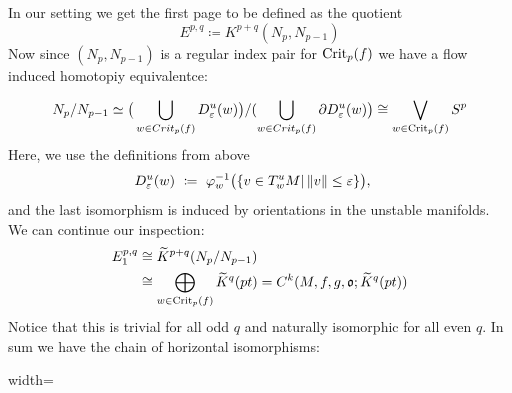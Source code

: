 \begin{corollary}
	In our setting we get the first page to be defined as the quotient
	\begin{equation*}
		E^{p,q}  \coloneq K^{p+q}(N_p,N_{p-1})
	\end{equation*}
	Now since $(N_p,N_{p-1})$ is a regular index pair for $\mathrm{Crit}_p(f)$ we have a flow induced homotopiy equivalentce:
	
	\begin{equation*}
		N_p\slash N_{p-1}
		\simeq          \big(\bigcup_{w\in Crit_p(f)}D^u_\varepsilon(w)\big) \slash (\bigcup_{w\in Crit_p(f)} \partial D^u_\varepsilon(w)\big)
		\cong           \bigvee_{w\in \mathrm{Crit}_p(f)}S^p
	\end{equation*} Here, we use the definitions from above
	\begin{align*}
		D^{u}_\varepsilon (w)&~\coloneq~ \varphi_w^{-1} \big(\{v\in T_w^{u }M | \left\lVert v\right\rVert\leq \varepsilon \} \big),
	\end{align*}and the last isomorphism is induced by orientations in the unstable manifolds. We can continue our inspection:
	\begin{align}\label{def: The Map between E_1 and Morse chain group}
		E^{p,q}_1&\cong \widetilde{K}^{p+q}(N_p\slash N_{p-1})\\
		&\cong \bigoplus_{w\in \mathrm{Crit}_p(f)}\widetilde{K}^q(pt)=C^k(M,f,g,\mathfrak{o};\widetilde{K}^q(pt))\\
	\end{align} Notice that this is trivial for all odd $q$ and naturally isomorphic for all even $q$. In sum we have the chain of horizontal isomorphisms:
	\begin{fdiagram}\label{diag: first page comparison}
		\begin{adjustbox}{width=\textwidth}
		\end{adjustbox}
		

\end{fdiagram}
\end{corollary}
